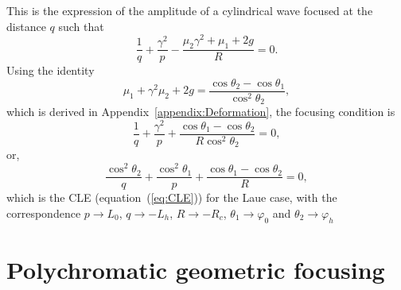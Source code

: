 \documentclass[preprint]{iucr}              %
\begin{document}
This is the expression of the amplitude of a cylindrical wave focused at the distance $q$ such that
\begin{equation}
    \frac{1}{q}+\frac{\gamma^2}{p}-\frac{\mu_2\gamma^2+\mu_1+2g}{R}=0. 
\end{equation}
Using the identity
\begin{equation}
\label{eq:appendixIdentity}
    \mu_1+\gamma^2\mu_2+2g=\frac{\cos\theta_2-\cos\theta_1}{\cos^2\theta_2},
\end{equation}
which is derived in Appendix~\ref{appendix:Deformation}, the focusing condition is 
\begin{equation}
    \frac{1}{q}+\frac{\gamma^2}{p}+\frac{\cos\theta_1-\cos\theta_2}{R\cos^2\theta_2}=0,
\end{equation}
or,
\begin{equation}
    \frac{\cos^2\theta_2}{q}+\frac{\cos^2\theta_1}{p}+\frac{\cos\theta_1-\cos\theta_2}{R}=0,
\end{equation}
which is the CLE (equation~(\ref{eq:CLE})) for the Laue case, with the correspondence $p \rightarrow L_0$, $q \rightarrow -L_h$, $R \rightarrow -R_c$, $\theta_1 \rightarrow \varphi_0$ and $\theta_2 \rightarrow \varphi_h$


\section{Polychromatic geometric focusing}
\label{sec:polychromatic}
%
\end{document}
